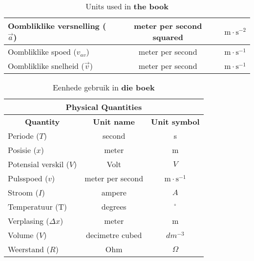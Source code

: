 {\begin{table}[H]
\begin{center}
\begin{tabular}{|l|c|c|}
Oombliklike versnelling ($\vec{a}$)  & meter per second squared & $\text{m} \cdot \text{s}^{-2}$ \\ \hline
Oombliklike spoed (${v}_{av}$)      & meter per second & $\text{m} \cdot \text{s}^{-1}$  \\ \hline
Oombliklike snelheid ($\vec{v}$)       & meter per second & $\text{m} \cdot \text{s}^{-1}$  \\ \hline
\end{tabular}
\end{center}
\caption{Units used in \textbf{the book} }
\label{table:book::units1}
\end{table}
\begin{table}[H]
\begin{center}
\begin{tabular}{|l|c|c|}\hline \hline 
\multicolumn{3}{|c|}{\textbf{Physical Quantities}}\\ \hline \hline
\multicolumn{1}{|c|}{\textbf{Quantity}} & \textbf{Unit name} & \textbf{Unit symbol}\\ \hline
Periode ($T$)             & second &  s                               \\ \hline
Posisie ($x$)             & meter & m                               \\ \hline 
Potensial verskil ($V$)            & Volt & $V$   \\ \hline
Pulsspoed ($v$)             & meter per second & $\text{m} \cdot \text{s}^{-1}$ \\ \hline
Stroom ($I$)             & ampere & $A$                             \\ \hline
Temperatuur (T)               & degrees & $^{\circ}$ \\ \hline
Verplasing ($\Delta x$)      & meter  & m                                \\ \hline
Volume ($V$)             & decimetre cubed & $dm^{-3}$  \\ \hline
Weerstand  ($R$)             & Ohm & $\Omega$ \\ \hline 
\end{tabular}
\end{center}
\caption{Eenhede gebruik in \textbf{die boek} }
\label{table:book::units2}
\end{table}}
